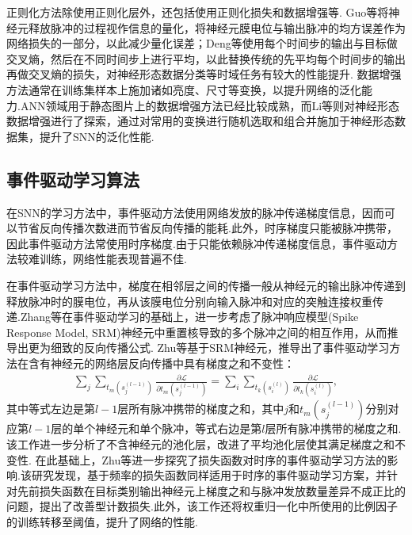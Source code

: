 \documentclass{SCIS2020cn}
\begin{document}
正则化方法除使用正则化层外，还包括使用正则化损失和数据增强等.
Guo等\cite{Guo_2023_ICCV_rmp}将神经元释放脉冲的过程视作信息的量化，将神经元膜电位与输出脉冲的均方误差作为网络损失的一部分，以此减少量化误差；Deng等\cite{deng2022temporal}使用每个时间步的输出与目标做交叉熵，然后在不同时间步上进行平均，以此替换传统的先平均每个时间步的输出再做交叉熵的损失，对神经形态数据分类等时域任务有较大的性能提升.
数据增强方法通常在训练集样本上施加诸如亮度、尺寸等变换，以提升网络的泛化能力.ANN领域用于静态图片上的数据增强方法已经比较成熟，而Li等\cite{li2022neuromorphic}则对神经形态数据增强进行了探索，通过对常用的变换进行随机选取和组合并施加于神经形态数据集，提升了SNN的泛化性能.





\subsection{事件驱动学习算法}%


在SNN的学习方法中，事件驱动方法使用网络发放的脉冲传递梯度信息，因而可以节省反向传播次数进而节省反向传播的能耗.此外，时序梯度只能被脉冲携带，因此事件驱动方法常使用时序梯度.由于只能依赖脉冲传递梯度信息，事件驱动方法较难训练，网络性能表现普遍不佳.



在事件驱动学习方法中，梯度在相邻层之间的传播一般从神经元的输出脉冲传递到释放脉冲时的膜电位，再从该膜电位分别向输入脉冲和对应的突触连接权重传递.Zhang等\cite{zhang2020temporal}在事件驱动学习的基础上，进一步考虑了脉冲响应模型(Spike Response Model, SRM)神经元中重置核导致的多个脉冲之间的相互作用，从而推导出更为细致的反向传播公式.
Zhu等\cite{zhu2022training}基于SRM神经元，推导出了事件驱动学习方法在含有神经元的网络层反向传播中具有梯度之和不变性：
\begin{align}
    \sum_j \sum_{t_m(s_j^{(l-1)})} \frac{\partial \mathcal{L}}{\partial t_m(s_j^{(l-1)})} = 
    \sum_i \sum_{t_k(s_i^{(l)})} \frac{\partial \mathcal{L}}{\partial t_k(s_i^{(l)})},
\end{align}
其中等式左边是第$l-1$层所有脉冲携带的梯度之和，其中$j$和$t_m(s_j^{(l-1)})$分别对应第$l-1$层的单个神经元和单个脉冲，等式右边是第$l$层所有脉冲携带的梯度之和.
该工作进一步分析了不含神经元的池化层，改进了平均池化层使其满足梯度之和不变性.
在此基础上，Zhu等\cite{zhu2024exploring}进一步探究了损失函数对时序的事件驱动学习方法的影响.该研究发现，基于频率的损失函数同样适用于时序的事件驱动学习方案，并针对先前损失函数在目标类别输出神经元上梯度之和与脉冲发放数量差异不成正比的问题，提出了改善型计数损失.此外，该工作还将权重归一化中所使用的比例因子的训练转移至阈值，提升了网络的性能.
\end{document}
